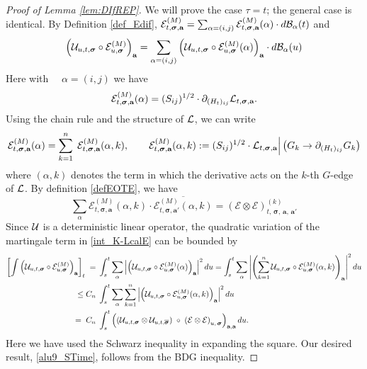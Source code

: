 \documentclass[10pt,reqno]{article}
\theoremstyle{plain} %
\theoremstyle{remark}
\numberwithin{equation}{section}
\begin{document}
\begin{proof}[Proof of Lemma \ref{lem:DIfREP}]


 

We will prove the case $\tau =t$; the general case is identical. 
By Definition \ref{def_Edif}, $
 \mathcal{E}^{(M)}_{t, \boldsymbol{\sigma}, \textbf{a}}=\sum_{\alpha=(i,j)} \mathcal{E}^{(M)}_{t, \boldsymbol{\sigma}, \textbf{a}}(\alpha)\cdot d{\cal B}_\alpha(t) $ 
 and 
 $$
 \left(\mathcal{U}_{u, t, \boldsymbol{\sigma}}\circ \mathcal{E}^{(M)}_{u, \boldsymbol{\sigma}}\right)_{\textbf{a}}=
 \sum_{\alpha=(i,j)}
 \left(
 \mathcal{U}_{u, t, \boldsymbol{\sigma}} \circ\mathcal{E}^{(M)}_{u, \boldsymbol{\sigma}}
 (\alpha)
 \right)_{\textbf{a}}\cdot d{\cal B}_\alpha(u)
 $$
Here with $\quad \alpha=(i,j)$ we have 
$$
\mathcal{E}^{(M)}_{t, \boldsymbol{\sigma},\textbf{a}}
 (\alpha)
 =(S_{ij})^{1/2}\cdot \partial_{(H_t)_{ij}} {\cal L}_{t,\boldsymbol{\sigma},\textbf{a}}.
$$
Using  the chain rule and the structure of $\cal L$, we can write 
 $$
\mathcal{E}^{(M)}_{t, \boldsymbol{\sigma},\textbf{a}}
 (\alpha)=\sum_{k=1}^{n}\;\mathcal{E}^{(M)}_{t, \boldsymbol{\sigma},\textbf{a}}
 (\alpha, k), \quad \quad \mathcal{E}^{(M)}_{t, \boldsymbol{\sigma},\textbf{a}}
 (\alpha, k):=(S_{ij})^{1/2}\cdot  {\cal L}_{t,\boldsymbol{\sigma},\textbf{a}}\Big|\left(G_k\to \partial_{(H_t)_{ij}}G_k\right)$$
 where $(\alpha,k)$ denotes the term in which the derivative acts on the $k$-th $G$-edge of $\cal L$.  By definition  \eqref{defEOTE},  we have 
 $$
 \sum_\alpha   \mathcal{E}^{(M)}_{t, \boldsymbol{\sigma},\textbf{a}}
 (\alpha, k)\cdot \overline {\mathcal{E}^{(M)}_{t, \boldsymbol{\sigma},\textbf{a}'}(\alpha, k)}=
 \left(\mathcal{E}\otimes  \mathcal{E}\right)^{(k)}_{t, \,\boldsymbol{\sigma}, \,\textbf{a},\,\textbf{a}'}
 $$
 Since  $\cal U$ is a deterministic linear operator,   the  quadratic  variation of the martingale  term in \eqref{int_K-LcalE}
 can be bounded by 
 \begin{align} \label{UEUEdif}
  \left[\int \left(\mathcal{U}_{u, t, \boldsymbol{\sigma}} \circ \mathcal{E}^{(M)}_{u, \boldsymbol{\sigma}}\right)_{\textbf{a}} \right ]_t
\;=\; & \int_s^t
\sum_{\alpha}\left| \left(\mathcal{U}_{u, t, \boldsymbol{\sigma}} \circ\mathcal{E}^{(M)}_{u, \boldsymbol{\sigma}}(\alpha )\right)_{\textbf{a}}
 \right|^2 du 
 = \int_s^t
\sum_{\alpha}\left|\left(\sum_{k=1}^n \mathcal{U}_{u, t, \boldsymbol{\sigma}} \circ\mathcal{E}^{(M)}_{u, \boldsymbol{\sigma}}(\alpha, k)\right)_{\textbf{a}}
 \right|^2 du
 \nonumber \\
\; \;\le C_n\; &\int_s^t
\sum_{\alpha}\sum_{k=1}^n\left| \left(\mathcal{U}_{u, t, \boldsymbol{\sigma}} \circ\mathcal{E}^{(M)}_{u, \boldsymbol{\sigma}}(\alpha, k)\right)_{\textbf{a}}
 \right|^2 du
\nonumber \\
\;=\;C_n \; &\int_{s}^t
\left(\left(
   \mathcal{U}_{u, t,  \boldsymbol{\sigma}}
   \otimes 
   \mathcal{U}_{u, t,  \overline{\boldsymbol{\sigma}}}
   \right) \;\circ  \;
   \left( \mathcal{E} \otimes  \mathcal{E} \right)
   _{u, \,\boldsymbol{\sigma}  }
   \right)_{{\textbf a}, {\textbf a}} du.
\end{align}
Here we have used the Schwarz inequality in expanding the square. 
Our desired result,  \eqref{alu9_STime}, follows from the BDG inequality.
  

\end{proof}
\end{document}
